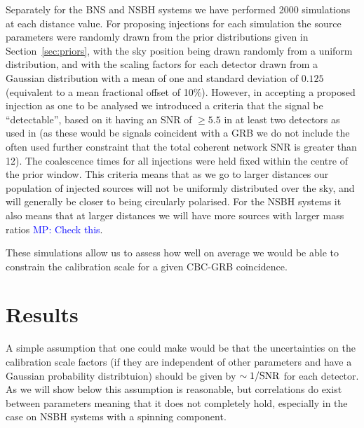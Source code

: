 \documentclass[10pt]{iopart}
\newcommand{\MP}[1]{\textcolor{blue}{MP: #1}}
\begin{document}
Separately for the \ac{BNS} and \ac{NSBH} systems we have performed 2000 simulations at each 
distance value. For proposing injections for each simulation the source parameters were randomly 
drawn from the prior distributions given in Section~\ref{sec:priors}, with the sky position being 
drawn randomly from a uniform distribution, and with the scaling factors for each detector drawn 
from a Gaussian distribution with a mean of one and standard deviation of $0.125$ (equivalent to a 
mean fractional offset of 10\%). However, in accepting a proposed injection as one to be analysed 
we introduced a criteria that the signal be ``detectable'', based on it having an SNR of $\geq 5.5$ 
in at least two detectors as used in \cite{2012PhRvD..85h2002A} (as these would be signals 
coincident with a GRB we do not include the often used further constraint that the total coherent 
network SNR is greater than 12). The coalescence times for all injections were held fixed 
within the centre of the prior window. This criteria means that as we go to larger distances our 
population of injected sources will not be uniformly distributed over the sky, and will generally 
be closer to being circularly polarised. For the \ac{NSBH} systems it also means that at larger 
distances we will have more sources with larger mass ratios \MP{Check this}.

These simulations allow us to assess how well on average we would be able to constrain the 
calibration scale for a given CBC-GRB coincidence.



\section{Results}\label{sec:results}

A simple assumption that one could make would be that the uncertainties on the calibration scale 
factors (if they are independent of other parameters and have a Gaussian probability distribtuion) 
should be given by $\sim 1/{\rm SNR}$ for each detector. As we will show below this assumption is 
reasonable, but correlations do exist between parameters meaning that it does not completely hold, 
especially in the case on \ac{NSBH} systems with a spinning component.
\end{document}
